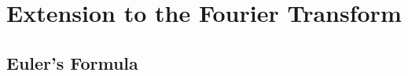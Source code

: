 \documentclass[hyperref={colorlinks=true}]{beamer}
\begin{document}
\section[Extension to the Fourier Transform]{Extension to the Fourier Transform}

\subsection[Euler's Formula]{Euler's Formula}
\end{document}
